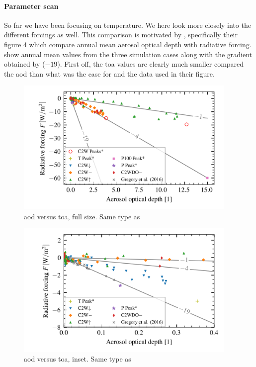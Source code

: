 \documentclass{ametsocV5}
\begin{document}
\paragraph*{Parameter scan}

So far we have been focusing on temperature. We here look more closely into the
different forcings as well. This comparison is motivated by \citet{gregory2016},
specifically their figure 4 which compare annual mean aerosol optical depth with
radiative forcing.  show annual mean values from the three
simulation cases along with the gradient obtained by \citet{gregory2016} (\(-19\)).
First off, the \acrshort{toa} values are clearly much smaller compared the
\acrshort{aod} than what was the case for \citet{gregory2016} and the data used in their
figure.

\begin{figure}
  \begin{center}
    \includegraphics[width=0.95\textwidth]{figures/aod_vs_toa_avg_full.png}
  \end{center}
  \caption{\acrshort{aod} versus \acrshort{toa}, full size. Same type as \cite{gregory2016}}
  \label{fig:aod_vs_toa_full}
\end{figure}

\begin{figure}
  \begin{center}
    \includegraphics[width=0.95\textwidth]{figures/aod_vs_toa_avg_inset.png}
  \end{center}
  \caption{\acrshort{aod} versus \acrshort{toa}, inset. Same type as \cite{gregory2016}}
  \label{fig:aod_vs_toa_inset}
\end{figure}
\end{document}
